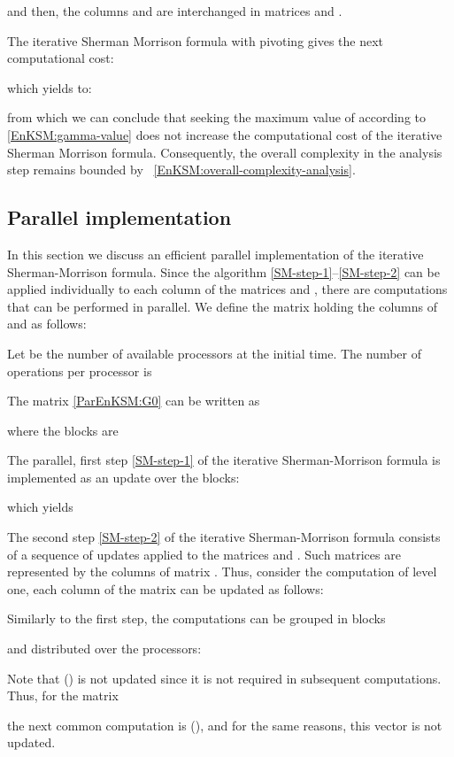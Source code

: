 \documentclass[12pt]{article}
\begin{document}
and then, the columns  and  are interchanged in matrices  and . 

The iterative Sherman Morrison formula with pivoting gives the next computational cost:

which yields to:

from which we can conclude that seeking the maximum value of  according to \eqref{EnKSM:gamma-value} does not increase the computational cost of the iterative Sherman Morrison formula. Consequently, the overall complexity in the analysis step remains bounded by ~\eqref{EnKSM:overall-complexity-analysis}. 

\subsection{Parallel implementation}
\label{parallelimpl}


In this section we discuss an efficient parallel implementation of the iterative Sherman-Morrison formula. Since the algorithm \eqref{SM-step-1}--\eqref{SM-step-2} can be applied individually to each column of the matrices  and , there are  computations that can be performed in parallel. We define the matrix  holding the columns of  and  as follows:

Let  be the number of available processors at the initial time. The number of operations per processor is 

The matrix \eqref{ParEnKSM:G0}  can be written as 

where the blocks  are 

The parallel, first step \eqref{SM-step-1} of the iterative Sherman-Morrison formula is implemented as an update over the blocks:

which yields


The second step \eqref{SM-step-2} of the iterative Sherman-Morrison formula consists of a sequence of updates applied to the matrices  and . Such matrices are represented by the columns of matrix . Thus, consider the computation of level one, each column of the matrix  can be updated as follows:

Similarly to the first step, the computations can be grouped in blocks

and distributed over the processors:

Note that  () is not updated since it is not required in subsequent computations. 
Thus, for the matrix 

the next common computation is  (), and for the same reasons, this vector is not updated. 
\end{document}
